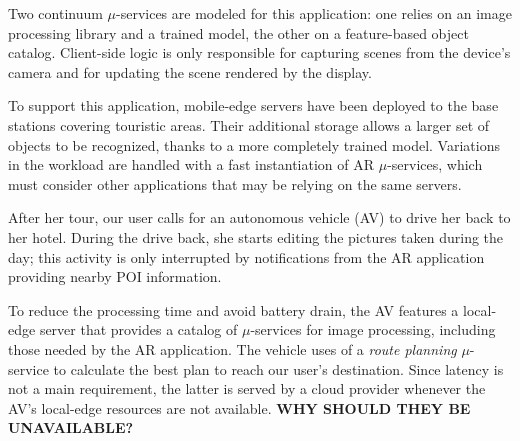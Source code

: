 Two continuum $\mu$-services are modeled for this application: one relies on an image processing library and a trained model, the other on a feature-based object catalog. Client-side logic is only responsible for capturing scenes from the device's camera and for updating the scene rendered by the display.


To support this application, mobile-edge servers have been deployed to the base stations covering touristic areas. Their additional storage allows a larger set of objects to be recognized, thanks to a more completely trained model. Variations in the workload are handled with a fast instantiation of AR $\mu$-services, which must consider other applications that may be relying on the same servers.


After her tour, our user calls for an autonomous vehicle (AV) to drive her back to her hotel. During the drive back, she starts editing the pictures taken during the day; this activity is only interrupted by notifications from the AR application providing nearby POI information. 

To reduce the processing time and avoid battery drain, the AV features a local-edge server that provides a catalog of $\mu$-services for image processing, including those needed by the AR application. The vehicle uses of a \textit{route planning} $\mu$-service
to calculate the best plan to reach our user's destination. Since latency is not a main requirement, the latter is served by a cloud provider whenever the AV's local-edge resources are not available. \textbf{WHY SHOULD THEY BE UNAVAILABLE?}



